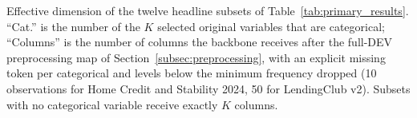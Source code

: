 \documentclass[final,5p,twocolumn]{elsarticle}
\newcommand{\Kfeat}{K}
\providecommand{\DIFdeltex}[1]{{\protect\color{red} \scriptsize #1}} %
\providecommand{\DIFdelFL}[1]{\DIFdel{#1}} %
\providecommand{\DIFdel}[1]{\texorpdfstring{\DIFdeltex{#1}}{}} %
\begin{document}
{%
\DIFdelFL{Effective dimension of the twelve headline subsets of Table~\ref{tab:primary_results}. ``Cat.'' is the number of the $\Kfeat$ selected original variables that are categorical; ``Columns'' is the number of columns the backbone receives after the full-DEV preprocessing map of Section~\ref{subsec:preprocessing}, with an explicit missing token per categorical and levels below the minimum frequency dropped (10 observations for Home Credit and Stability 2024, 50 for LendingClub v2). Subsets with no categorical variable receive exactly $\Kfeat$ columns.}}
\end{document}
